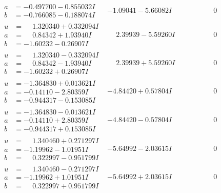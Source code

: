 \documentclass[1p]{elsarticle_modified}
\theoremstyle{definition}
\begin{document}
$$\begin{array}{c|c|c}
\begin{aligned}
a &= -0.497700 - 0.855032 I \\
b &= -0.766085 - 0.188074 I\end{aligned}
 & -1.09041 - 5.66082 I & \phantom{-0.000000 } 0 \\ \hline\begin{aligned}
u &= \phantom{-}1.320340 + 0.332094 I \\
a &= \phantom{-}0.84342 + 1.93940 I \\
b &= -1.60232 - 0.26907 I\end{aligned}
 & \phantom{-}2.39939 - 5.59260 I & \phantom{-0.000000 } 0 \\ \hline\begin{aligned}
u &= \phantom{-}1.320340 - 0.332094 I \\
a &= \phantom{-}0.84342 - 1.93940 I \\
b &= -1.60232 + 0.26907 I\end{aligned}
 & \phantom{-}2.39939 + 5.59260 I & \phantom{-0.000000 } 0 \\ \hline\begin{aligned}
u &= -1.364830 + 0.013621 I \\
a &= -0.14110 - 2.80359 I \\
b &= -0.944317 - 0.153085 I\end{aligned}
 & -4.84420 + 0.57804 I & \phantom{-0.000000 } 0 \\ \hline\begin{aligned}
u &= -1.364830 - 0.013621 I \\
a &= -0.14110 + 2.80359 I \\
b &= -0.944317 + 0.153085 I\end{aligned}
 & -4.84420 - 0.57804 I & \phantom{-0.000000 } 0 \\ \hline\begin{aligned}
u &= \phantom{-}1.340460 + 0.271297 I \\
a &= -1.19962 - 1.01951 I \\
b &= \phantom{-}0.322997 - 0.951799 I\end{aligned}
 & -5.64992 - 2.03615 I & \phantom{-0.000000 } 0 \\ \hline\begin{aligned}
u &= \phantom{-}1.340460 - 0.271297 I \\
a &= -1.19962 + 1.01951 I \\
b &= \phantom{-}0.322997 + 0.951799 I\end{aligned}
 & -5.64992 + 2.03615 I & \phantom{-0.000000 } 0 \\ \hline\begin{aligned}

\end{aligned}
\end{array}$$
\end{document}
